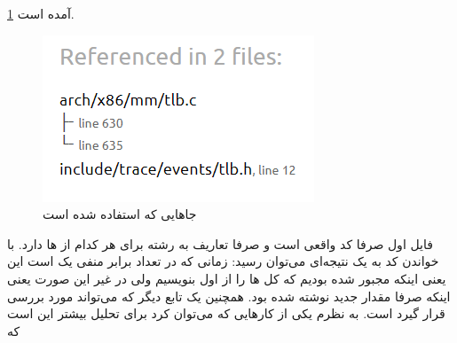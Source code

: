 \ref{fig:mysql:results:contextswitchref}
آمده است.
\begin{figure}[H]
    \centering
    \includegraphics[scale=0.7]{pictures/mysql/results/context-switch.png}
    \caption{جا‌هایی که  استفاده شده است}
    \label{fig:mysql:results:contextswitchref}
\end{figure}
فایل اول صرفا کد واقعی است و
صرفا تعاریف
به رشته برای هر کدام از
ها
دارد. با خواندن کد به یک نتیجه‌ای می‌توان رسید:
زمانی که در
تعداد
برابر منفی یک است این یعنی اینکه مجبور شده بودیم که کل
ها
را از اول بنویسیم ولی در غیر این صورت یعنی اینکه صرفا مقدار
جدید نوشته شده بود. همچنین یک تابع دیگر که می‌تواند مورد بررسی قرار گیرد
است. %
به نظرم یکی از کار‌هایی که می‌توان کرد برای تحلیل بیشتر این است که 

